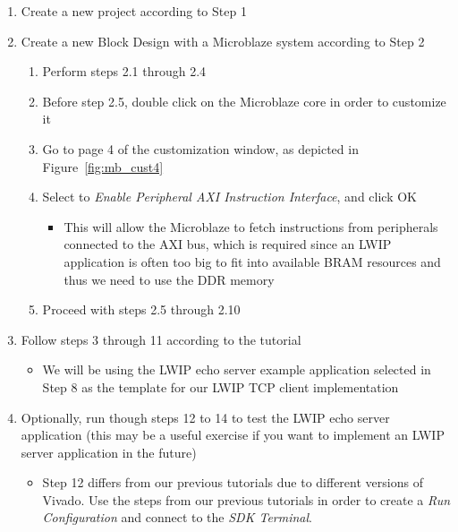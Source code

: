 \documentclass[11pt]{article}
\begin{document}
\begin{enumerate}
    \item Create a new project according to Step 1
    \item Create a new Block Design with a Microblaze system according to Step 2
    \begin{enumerate}
        \item Perform steps 2.1 through 2.4
        \item Before step 2.5, double click on the Microblaze core in order to customize it
        \item Go to page 4 of the customization window, as depicted in Figure~\ref{fig:mb_cust4}
        \item Select to \textit{Enable Peripheral AXI Instruction Interface}, and click OK
        \begin{itemize}
            \item This will allow the Microblaze to fetch instructions from peripherals connected to the AXI bus, which is required since an LWIP application is often too big to fit into available BRAM resources and thus we need to use the DDR memory
        \end{itemize}
        \item Proceed with steps 2.5 through 2.10
    \end{enumerate}
    \item Follow steps 3 through 11 according to the tutorial
    \begin{itemize}
        \item We will be using the LWIP echo server example application selected in Step 8 as the template for our LWIP TCP client implementation
    \end{itemize}
    \item Optionally, run though steps 12 to 14 to test the LWIP echo server application (this may be a useful exercise if you want to implement an LWIP server application in the future)
    \begin{itemize}
        \item Step 12 differs from our previous tutorials due to different versions of Vivado. Use the steps from our previous tutorials in order to create a \textit{Run Configuration} and connect to the \textit{SDK Terminal}.
    \end{itemize}
\end{enumerate}
\end{document}
